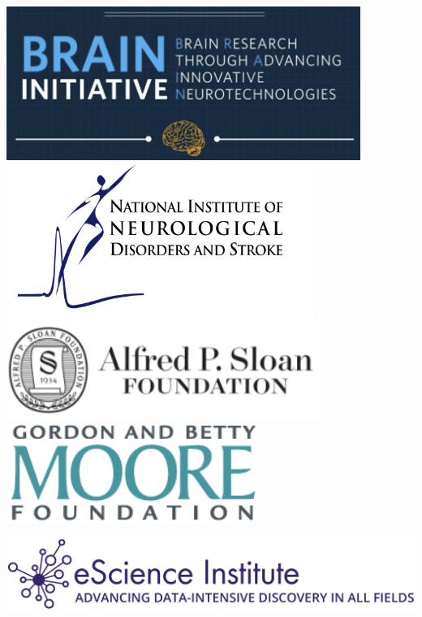 \documentclass[a0, landscape]{a0poster}
\begin{document}
\begin{multicols}{3}
\includegraphics[height=5cm]{brain-logo.png}
\includegraphics[height=5cm]{NINDS.jpg}\\
\includegraphics[height=3.2cm]{SloanLogo.png}
\includegraphics[height=3.2cm]{MooreFdn.png}
\includegraphics[height=3.2cm]{eSciencelogo.png}

\end{multicols}
\end{document}
